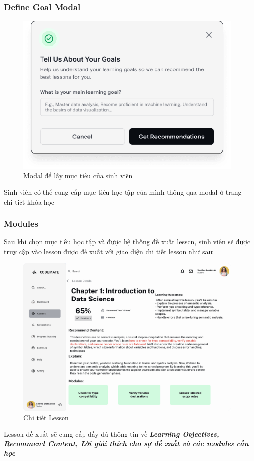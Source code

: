 \subsubsection{Define Goal Modal}
\begin{figure}[H]
    \centering
    \includegraphics[width=0.7\linewidth]{Images/figmaDesign/Get Goals Modal.png}
    \caption{Modal để lấy mục tiêu của sinh viên}
    \label{fig:enter-label}
\end{figure}
Sinh viên có thể cung cấp mục tiêu học tập của mình thông qua modal ở trang chi tiết khóa học
\subsubsection{Modules}
Sau khi chọn mục tiêu học tập và được hệ thống đề xuất lesson, sinh viên sẽ được truy cập vào lesson được đề xuất với giao diện chi tiết lesson như sau: 
\begin{figure}[H]
    \centering
    \includegraphics[scale=0.3]{Images/figmaDesign/Detailed Lesson Page.png}
    \caption{Chi tiết Lesson}
    \label{fig:enter-label}
\end{figure}
Lesson đề xuất sẽ cung cấp đầy đủ thông tin về \textbf{\textit{Learning Objectives, Recommend Content, Lời giải thích cho sự đề xuất và các modules cần học}}
